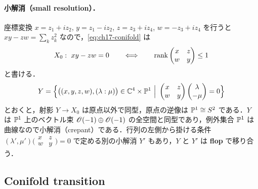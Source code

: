\paragraph{小解消（small resolution）．}
座標変換 $x=z_1+iz_2$, $y=z_1-iz_2$, $z=z_3+iz_4$, $w=-z_3+iz_4$ を行うと $xy-zw=\sum_kz_k^2$ なので，\eqref{eq:ch17-conifold} は
\[
X_0:\ xy-zw=0\qquad\Longleftrightarrow\qquad \operatorname{rank}\begin{pmatrix}x&z\\w&y\end{pmatrix}\le1
\]
と書ける．
\[
Y=\Bigl\{\bigl((x,y,z,w),(\lambda:\mu)\bigr)\in\C^4\times\PP^1\ \Big|\ \begin{pmatrix}x&z\\w&y\end{pmatrix}\begin{pmatrix}\lambda\\-\mu\end{pmatrix}=0\Bigr\}
\]
とおくと，射影 $Y\to X_0$ は原点以外で同型，原点の逆像は $\mathbb{P}^1\cong S^2$ である．$Y$ は $\mathbb{P}^1$ 上のベクトル束 $\mathscr{O}(-1)\oplus\mathscr{O}(-1)$ の全空間と同型であり，例外集合 $\mathbb{P}^1$ は曲線なので小解消（crepant）である．行列の左側から掛ける条件 $(\lambda',\mu')\bigl(\begin{smallmatrix}x&z\\w&y\end{smallmatrix}\bigr)=0$ で定める別の小解消 $Y'$ もあり，$Y$ と $Y'$ は \textbf{flop} で移り合う．

\subsection{Conifold transition}

